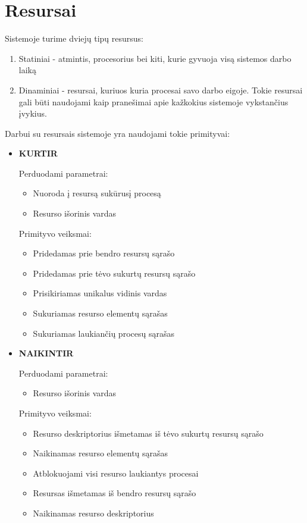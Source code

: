 \documentclass{scrartcl}
\begin{document}
    \section{Resursai}
      Sistemoje turime dviejų tipų resursus:
      \begin{enumerate}
        \item Statiniai - atmintis, procesorius bei kiti, kurie gyvuoja visą sistemos darbo laiką
        \item Dinaminiai - resursai, kuriuos kuria procesai savo darbo eigoje. Tokie resursai gali būti naudojami kaip pranešimai apie kažkokius sistemoje vykstančius įvykius.
      \end{enumerate}
      Darbui su resursais sistemoje yra naudojami tokie primityvai:
      \begin{itemize}
        \item \textbf{KURTIR}
          \par
          Perduodami parametrai:
          \begin{itemize}
            \item Nuoroda į resursą sukūrusį procesą
            \item Resurso išorinis vardas
          \end{itemize}
          Primityvo veiksmai:
          \begin{itemize}
            \item Pridedamas prie bendro resursų sąrašo
            \item Pridedamas prie tėvo sukurtų resursų sąrašo
            \item Prisikiriamas unikalus vidinis vardas
            \item Sukuriamas resurso elementų sąrašas
            \item Sukuriamas laukiančių procesų sąrašas
          \end{itemize}

        \item \textbf{NAIKINTIR}
          \par
          Perduodami parametrai:
          \begin{itemize}
            \item Resurso išorinis vardas
          \end{itemize}
          Primityvo veiksmai:
          \begin{itemize}
            \item Resurso deskriptorius išmetamas iš tėvo sukurtų resursų sąrašo
            \item Naikinamas resurso elementų sąrašas
            \item Atblokuojami visi resurso laukiantys procesai
            \item Resursas išmetamas iš bendro resursų sąrašo
            \item Naikinamas resurso deskriptorius
          \end{itemize}


\end{itemize}
\end{document}
